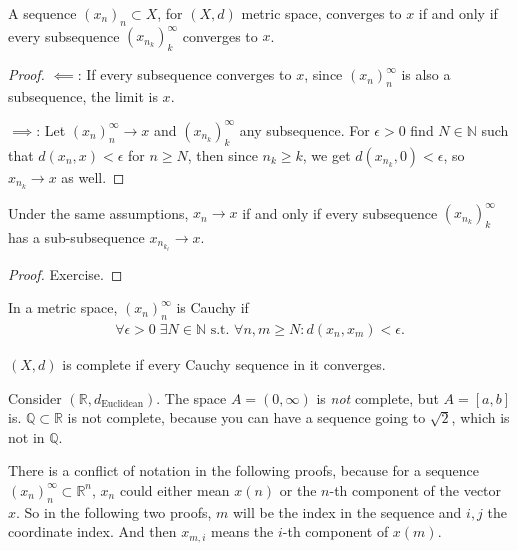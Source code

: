 \begin{lemma}\label{lem:subseq_lim}
    A sequence $(x_{n})_{n} \subset X$, for $(X,d)$ metric space, converges to $x$ if and only if every subsequence $(x_{n_{k}})_{k}^{\infty}$ converges to $x$.
\end{lemma}
\begin{proof}
    $\impliedby$: If every subsequence converges to $x$, since $(x_{n})_{n}^{\infty}$ is also a subsequence, the limit is $x$.

    $\implies$: Let $(x_{n})_{n}^{\infty} \to x$ and $(x_{n_{k}})_{k}^{\infty}$ any subsequence. For $\epsilon > 0$ find $N \in \mathbb{N}$ such that $d(x_{n},x) < \epsilon$ for $n \geq N$, then since $n_{k} \geq k$, we get $d(x_{n_{k}}, 0) < \epsilon$, so $x_{n_{k}} \to x$ as well.
\end{proof}

\begin{lemma}\label{lem:subseq_lim_2}
    Under the same assumptions, $x_{n} \to x$ if and only if every subsequence $(x_{n_{k}})_{k}^{\infty}$ has a sub-subsequence $x_{n_{k_{\ell}}} \to x$.
\end{lemma}
\begin{proof}
    Exercise.
\end{proof}

\begin{definition}\label{def:cauchy_seq}
    In a metric space, $(x_{n})_{n}^{\infty}$ is Cauchy if 
    \begin{align*}
        \forall \epsilon > 0 \; \exists N \in \mathbb{N} \text{ s.t. } \forall n,m \geq N: d(x_{n}, x_{m}) < \epsilon.
    \end{align*}
\end{definition}

\begin{definition}[Completeness]\label{def:completeness}
   $(X,d)$ is complete if every Cauchy sequence in it converges.
\end{definition}

\begin{eg} 
    Consider $(\mathbb{R}, d_{\text{Euclidean}})$. The space $A = (0,\infty)$ is \textit{not} complete, but $A = [a,b]$ is. $\mathbb{Q} \subset \mathbb{R}$ is not complete, because you can have a sequence going to $\sqrt{2}$, which is not in $\mathbb{Q}$.
\end{eg}

\begin{remark}
    There is a conflict of notation in the following proofs, because for a sequence $(x_{n})_{n}^{\infty} \subset \mathbb{R}^{n}$, $x_{n}$ could either mean $x(n)$ or the $n$-th component of the vector $x$. So in the following two proofs, $m$ will be the index in the sequence and $i,j$ the coordinate index. And then $x_{m,i}$ means the $i$-th component of $x(m)$.
\end{remark}


